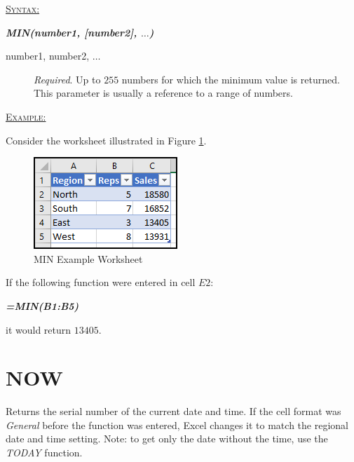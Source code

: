 \begin{addmargin}[1cm]{0cm}
	
	\medskip
	\underline{\textsc{Syntax:}}
	\medskip
	
	{\color{Syntax}
		\noindent\textbf{\textit{MIN(number1, [number2], $\ldots$)}}
	}
	
	\begin{description}
		\item[number1, number2, $\ldots$] \textit{Required}. Up to $ 255 $ numbers for which the minimum value is returned.  This parameter is usually a reference to a range of numbers.
	\end{description}

	\medskip
	\noindent\underline{\textsc{Example:}}
	\medskip
	
	\noindent Consider the worksheet illustrated in Figure \ref{apa:min}.
	
	\begin{figure}[H]
		\centering
		\includegraphics[width=\maxwidth{.45\linewidth}]{gfx/apa_fig01}
		\caption{MIN Example Worksheet}
		\label{apa:min}
	\end{figure}
	
	\noindent If the following function were entered in cell $ E2 $:
	
	{\color{Syntax}
		\textit{\textbf{=MIN(B1:B5)}}
	}
	
	\noindent it would return $ 13405 $.

\end{addmargin}

\section{NOW}

Returns the serial number of the current date and time. If the cell format was \textit{General} before the function was entered, Excel changes it to match the regional date and time setting. Note: to get only the date without the time, use the \textit{TODAY} function.

